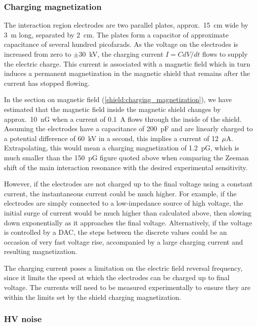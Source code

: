 \subsubsection{Charging magnetization}

The interaction region electrodes are two parallel plates, approx.\ 15~cm wide
by 3~m long, separated by 2~cm. The plates form a capacitor of approximate
capacitance of several hundred picofarads. As the voltage on the electrodes is
increased from zero to $\pm30$~kV, the charging current $I=CdV/dt$ flows to
supply the electric charge. This current is associated with a magnetic field
which in turn induces a permanent magnetization in the magnetic shield that
remains after the current has stopped flowing.

In the section on magnetic field (\ref{shield:charging_magnetization}), we have
estimated that the magnetic field inside the magnetic shield changes by approx.\
10~nG when a current of 0.1~A flows through the inside of the shield. Assuming
the electrodes have a capacitance of 200~pF and are linearly charged to a
potential difference of 60~kV in a second, this implies a current of 12~$\mu$A.
Extrapolating, this would mean a charging magnetization of 1.2~pG, which is much
smaller than the 150~pG figure quoted above when comparing the Zeeman shift of
the main interaction resonance with the desired experimental sensitivity.

However, if the electrodes are not charged up to the final voltage using a
constant current, the instantaneous current could be much higher. For example,
if the electrodes are simply connected to a low-impedance source of high voltage,
the initial surge of current would be much higher than calculated above, then
slowing down exponentially as it approaches the final voltage. Alternatively, if
the voltage is controlled by a DAC, the steps between the discrete values could
be an occasion of very fast voltage rise, accompanied by a large charging
current and resulting magnetization.

The charging current poses a limitation on the electric field reversal
frequency, since it limits the speed at which the electrodes can be charged up
to final voltage. The currents will need to be measured experimentally to ensure
they are within the limits set by the shield charging magnetization.

\subsubsection{HV noise}

